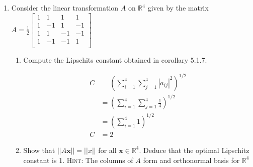 \documentclass[letterpaper]{article}
\begin{document}
\begin{enumerate}
\begin{enumerate}
    For any $\varepsilon$ we can find $r_1,r_2$ such that
    \begin{align*}
      |h(\boldsymbol{x})-L|&<\varepsilon&&\text{whenever}&0<||\boldsymbol{x}-\boldsymbol{c}||<r_1\\
      |f(\boldsymbol{x})-L|&<\varepsilon&&\text{whenever}&0<||\boldsymbol{x}-\boldsymbol{c}||<r_2\\
    \end{align*}
    \begin{align*}
      -\varepsilon&<h(\boldsymbol{x})-L<\varepsilon\\
      -\varepsilon&<f(\boldsymbol{x})-L<\varepsilon\\
      f(\boldsymbol{x})&\le g(\boldsymbol{x})\le h(\boldsymbol{x})\\
      f(\boldsymbol{x})-L&\le g(\boldsymbol{x})-L\le h(\boldsymbol{x})-L\\
      \intertext{and so when}
      0&<||\boldsymbol{x}-\boldsymbol{c}||<\min\{r_1,r_2\}
      \intertext{then}
      -\varepsilon&<f(\boldsymbol{x}-L\le g(\boldsymbol{x})-L\le h(\boldsymbol{x})-L<\varepsilon\\
      -\varepsilon&<g(\boldsymbol{x})-L<\varepsilon\\
    \end{align*}
  \setcounter{enumii}{12}
  \item
    Consider the linear transformation $A$ on $\mathbb{R}^4$ given by the matrix
    $A=\frac{1}{2}
    \left[
    \begin{array}{rrrr}
    1&1&1&1\\
    1&-1&1&-1\\
    1&1&-1&-1\\
    1&-1&-1&1\\
    \end{array}
    \right]$
    \begin{enumerate}
    \item
      Compute the Lipschits constant obtained in corollary 5.1.7.

      \begin{align*}
        C&=\left(\sum\limits_{i=1}^4{\sum\limits_{j=1}^4{|a_{ij}|^2}}\right)^{1/2}\\
        &=\left(\sum\limits_{i=1}^4{\sum\limits_{j=1}^4{\frac{1}{4}}}\right)^{1/2}\\
        &=\left(\sum\limits_{i=1}^4{1}\right)^{1/2}\\
        C&=2
      \end{align*}
    \item
      Show that $||A\boldsymbol{x}||=||x||$ for all $\boldsymbol{x}\in \mathbb{R}^4$. Deduce that the optimal Lipschitz constant is 1.
      {\scshape Hint:} The columns of $A$ form and orthonormal basis for $\mathbb{R}^4$


\end{enumerate}
\end{enumerate}
\end{enumerate}
\end{document}
